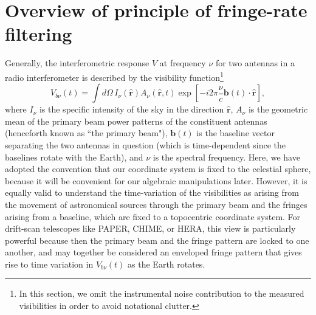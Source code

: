 \documentclass[twocolumn,apj,numberedappendix]{emulateapj}
\newcommand{\rhat}{\hat{\mathbf{r}}}
\begin{document}
\section{Overview of principle of fringe-rate filtering}
\label{sec:overview}
Generally, the interferometric response $V$ at frequency $\nu$ for two antennas in a radio interferometer is described
by the visibility function\footnote{In this section, we omit the instrumental noise contribution to the measured visibilities in order to avoid notational clutter.}
\begin{equation}
\label{eq:originalVis}
V_{b\nu}(t)=\int d\Omega \, {I_\nu(\rhat) A_\nu(\rhat,t) \exp \left[-i2\pi \frac{\nu}{c}  \mathbf{b}(t) \cdot \rhat\right]},
\end{equation}
where $I_\nu$ is the specific intensity of the sky in the direction $\rhat$,
$A_\nu$ is the geometric mean of the primary beam power patterns of the constituent antennas (henceforth known as ``the primary beam"), $\mathbf{ b}(t)$ is the baseline vector separating the two antennas in question (which is time-dependent since the baselines rotate with the Earth), and $\nu$ is the spectral
frequency.
Here, we have adopted the convention that our coordinate system is fixed to the celestial sphere, because it will be convenient for our algebraic manipulations later. However, it is equally valid to understand the time-variation of the visibilities as arising from the movement of astronomical sources through the primary beam and the fringes arising from a baseline, which are fixed to a topocentric coordinate system. For drift-scan telescopes like PAPER, CHIME, or HERA, this view is particularly powerful because then the primary beam and the fringe pattern are locked to one another, and may together be considered an enveloped fringe pattern that gives rise
to time variation in $V_{b\nu}(t)$ as the Earth rotates.
\end{document}
